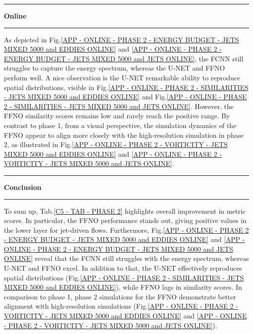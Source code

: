 \rule[0cm]{\linewidth}{0.025cm}
\begin{center}
\small \textbf{Online}
\end{center}
\rule[0.3cm]{\linewidth}{0.025cm}

As depicted in Fig.\ref{APP - ONLINE - PHASE 2 - ENERGY BUDGET -  JETS MIXED 5000 and EDDIES ONLINE} and \ref{APP - ONLINE - PHASE 2 - ENERGY BUDGET -  JETS MIXED 5000 and JETS ONLINE}, the FCNN still struggles to capture the energy spectrum, whereas the U-NET and FFNO perform well. A nice observation is the U-NET remarkable ability to reproduce spatial distributions, visible in Fig.\ref{APP - ONLINE - PHASE 2 - SIMILARITIES -  JETS MIXED 5000 and EDDIES ONLINE} and Fig.\ref{APP - ONLINE - PHASE 2 - SIMILARITIES -  JETS MIXED 5000 and JETS ONLINE}. However, the FFNO similarity scores remains low and rarely reach the positive range. By contrast to phase 1, from a visual perspective, the simulation dynamics of the FFNO appear to align more closely with the high-resolution simulation in phase 2, as illustrated in Fig.\ref{APP - ONLINE - PHASE 2 - VORTICITY - JETS MIXED 5000 and EDDIES ONLINE} and \ref{APP - ONLINE - PHASE 2 - VORTICITY - JETS MIXED 5000 and JETS ONLINE}.\\

\rule[0cm]{\linewidth}{0.025cm}
\begin{center}
\small \textbf{Conclusion}
\end{center}
\rule[0.3cm]{\linewidth}{0.025cm}

To sum up, Tab.\ref{C5 - TAB - PHASE 2} highlights overall improvement in metric scores. In particular, the FFNO performance stands out, giving positive values in the lower layer for jet-driven flows. Furthermore, Fig.\ref{APP - ONLINE - PHASE 2 - ENERGY BUDGET -  JETS MIXED 5000 and EDDIES ONLINE} and \ref{APP - ONLINE - PHASE 2 - ENERGY BUDGET -  JETS MIXED 5000 and JETS ONLINE} reveal that the FCNN still struggles with the energy spectrum, whereas U-NET and FFNO excel. In addition to that, the U-NET effectively reproduces spatial distributions (Fig.\ref{APP - ONLINE - PHASE 2 - SIMILARITIES -  JETS MIXED 5000 and EDDIES ONLINE}), while FFNO lags in similarity scores. In comparison to phase 1, phase 2 simulations for the FFNO demonstrate better alignment with high-resolution simulations (Fig.\ref{APP - ONLINE - PHASE 2 - VORTICITY - JETS MIXED 5000 and EDDIES ONLINE} and \ref{APP - ONLINE - PHASE 2 - VORTICITY - JETS MIXED 5000 and JETS ONLINE}).

\newpage


